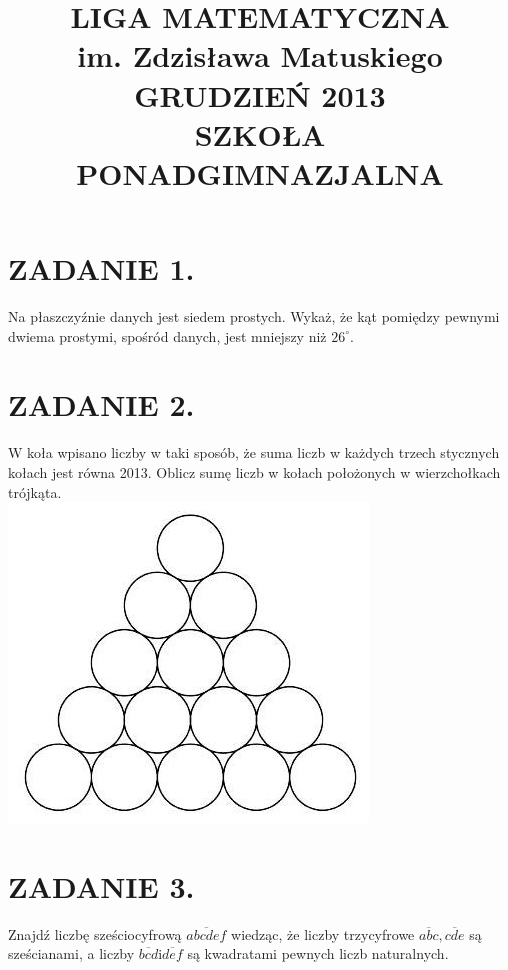\documentclass[10pt]{article}
\title{LIGA MATEMATYCZNA \\
 im. Zdzisława Matuskiego GRUDZIEŃ 2013 \\
 SZKOŁA PONADGIMNAZJALNA }
\author{}
\date{}
\begin{document}
\maketitle
\section*{ZADANIE 1.}
Na płaszczyźnie danych jest siedem prostych. Wykaż, że kąt pomiędzy pewnymi dwiema prostymi, spośród danych, jest mniejszy niż \(26^{\circ}\).

\section*{ZADANIE 2.}
W koła wpisano liczby w taki sposób, że suma liczb w każdych trzech stycznych kołach jest równa 2013. Oblicz sumę liczb w kołach położonych w wierzchołkach trójkąta.\\
\includegraphics[max width=\textwidth, center]{2024_11_21_24f84c87756b38f2c616g-1}

\section*{ZADANIE 3.}
Znajdź liczbę sześciocyfrową \(\overline{a b c d e f}\) wiedząc, że liczby trzycyfrowe \(\overline{a b c}, \overline{c d e}\) są sześcianami, a liczby \(\overline{b c d} \mathrm{i} \overline{d e f}\) są kwadratami pewnych liczb naturalnych.
\end{document}
